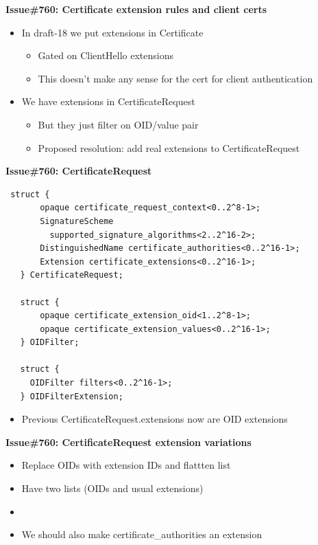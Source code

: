 \documentclass[helvetica]{seminar}
\newcommand{\heading}[1]{%
  \begin{center} 
    \large\bf 
    #1 
  \end{center} 
  \vspace{.4 in}}
\begin{document}
\begin{slide}
\heading{Issue\#760: Certificate extension rules and client certs}

\begin{itemize}
\item In draft-18 we put extensions in Certificate
  \begin{itemize}
  \item Gated on ClientHello extensions
  \item This doesn't make any sense for the cert for client authentication
  \end{itemize}

\item We have extensions in CertificateRequest
  \begin{itemize}
  \item But they just filter on OID/value pair
  \item Proposed resolution: add real extensions to CertificateRequest
  \end{itemize}
\end{itemize}
\end{slide}

\begin{slide}
\heading{Issue\#760: CertificateRequest}

\vspace{-5ex}
{\scriptsize
\begin{verbatim}
 struct {
       opaque certificate_request_context<0..2^8-1>;
       SignatureScheme
         supported_signature_algorithms<2..2^16-2>;
       DistinguishedName certificate_authorities<0..2^16-1>;
       Extension certificate_extensions<0..2^16-1>;
   } CertificateRequest;

   struct {
       opaque certificate_extension_oid<1..2^8-1>;
       opaque certificate_extension_values<0..2^16-1>;
   } OIDFilter;

   struct {
     OIDFilter filters<0..2^16-1>;
   } OIDFilterExtension;
\end{verbatim}
}

\begin{itemize}
\item Previous CertificateRequest.extensions now are OID extensions
\end{itemize}
\end{slide}

\begin{slide}
\heading{Issue\#760: CertificateRequest extension variations}

\begin{itemize}
\item Replace OIDs with extension IDs and flattten list
\item Have two lists (OIDs and usual extensions)
\item[]
\item We should also make certificate\_authorities an extension
\end{itemize}
\end{slide}
\end{document}
